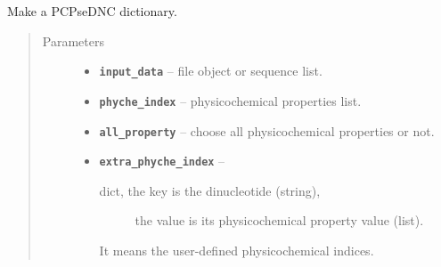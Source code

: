 \documentclass[letterpaper,10pt,english]{sphinxmanual}
\begin{document}
\begin{fulllineitems}
\label{reference/PyDNApsenac:PyDNApsenac.GetPCPseTNC}
Make a PCPseDNC dictionary.
\begin{quote}\begin{description}
\item[{Parameters}] \leavevmode\begin{itemize}
\item {} 
\textbf{\texttt{input\_data}} -- file object or sequence list.

\item {} 
\textbf{\texttt{phyche\_index}} -- physicochemical properties list.

\item {} 
\textbf{\texttt{all\_property}} -- choose all physicochemical properties or not.

\item {} 
\textbf{\texttt{extra\_phyche\_index}} -- \begin{description}
\item[{dict, the key is the dinucleotide (string),}] \leavevmode
the value is its physicochemical property value (list).

\end{description}

It means the user-defined physicochemical indices.


\end{itemize}

\end{description}\end{quote}

\end{fulllineitems}

\end{document}

